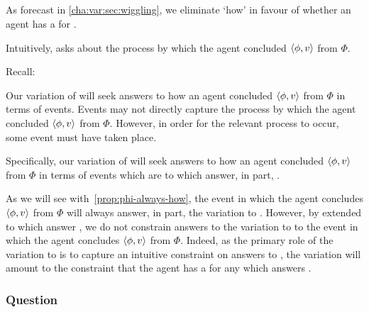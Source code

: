 \subsection{\qHowV{}}
\label{cha:var:sec:vars:qhowv}

\begin{note}
  As forecast in \autoref{cha:var:sec:wiggling}, we eliminate `how' in favour of whether an agent has a  for \ros{}.

  Intuitively, \qHow{} asks about the process by which the agent concluded \(\langle \phi, v \rangle\) from \(\Phi\).

  Recall:

  \begin{quote}%
    \vspace{-1.5\baselineskip}%
    \questionHowBasic*
  \end{quote}

  Our variation of \qHow{} will seek answers to how an agent concluded \(\langle \phi, v \rangle\) from \(\Phi\) in terms of events.
  Events may not directly capture the process by which the agent concluded \(\langle \phi, v \rangle\) from \(\Phi\).
  However, in order for the relevant process to occur, some event must have taken place.

  Specifically, our variation of \qHow{} will seek answers to how an agent concluded \(\langle \phi, v \rangle\) from \(\Phi\) in terms of events which are  to  which answer, in part, \qWhyVnP{}.

  As we will see with~\autoref{prop:phi-always-how}, the event in which the agent concludes \(\langle \phi, v \rangle\) from \(\Phi\) will always answer, in part, the variation to \qHow{}.
  However, by extended to \ros{} which answer \qWhyVnP{}, we do not constrain answers to the variation to \qHow{} to the event in which the agent concludes \(\langle \phi, v \rangle\) from \(\Phi\).
  Indeed, as the primary role of the variation to \qHow{} is to capture an intuitive constraint on answers to \qWhyVnP{}, the variation will amount to the constraint that the agent has a  for any  which answers \qWhyVnP{}.
\end{note}

\subsubsection{Question}
\label{cha:var:sec:vars:qhowv:sec:question}

